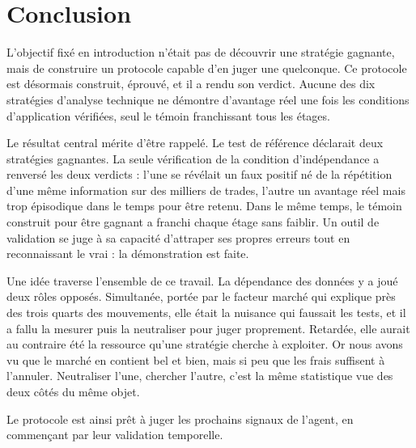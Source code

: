 \chapter*{Conclusion}
\label{chap:conclusion}

L'objectif fixé en introduction n'était pas de découvrir une stratégie
gagnante, mais de construire un protocole capable d'en juger une quelconque.
Ce protocole est désormais construit, éprouvé, et il a rendu son verdict.
Aucune des dix stratégies d'analyse technique ne démontre d'avantage réel une
fois les conditions d'application vérifiées, seul le témoin franchissant tous
les étages.

Le résultat central mérite d'être rappelé. Le test de référence déclarait deux
stratégies gagnantes. La seule vérification de la condition d'indépendance a
renversé les deux verdicts : l'une se révélait un faux positif né de la
répétition d'une même information sur des milliers de trades, l'autre un
avantage réel mais trop épisodique dans le temps pour être retenu. Dans le
même temps, le témoin construit pour être gagnant a franchi chaque étage sans
faiblir. Un outil de validation se juge à sa capacité d'attraper ses propres
erreurs tout en reconnaissant le vrai : la démonstration est faite.

Une idée traverse l'ensemble de ce travail. La dépendance des données y a joué
deux rôles opposés. Simultanée, portée par le facteur marché qui explique près
des trois quarts des mouvements, elle était la nuisance qui faussait les
tests, et il a fallu la mesurer puis la neutraliser pour juger proprement.
Retardée, elle aurait au contraire été la ressource qu'une stratégie cherche à
exploiter. Or nous avons vu que le marché en contient bel et bien, mais si peu
que les frais suffisent à l'annuler. Neutraliser l'une, chercher l'autre,
c'est la même statistique vue des deux côtés du même objet.

Le protocole est ainsi prêt à juger les prochains signaux de l'agent, en
commençant par leur validation temporelle.
